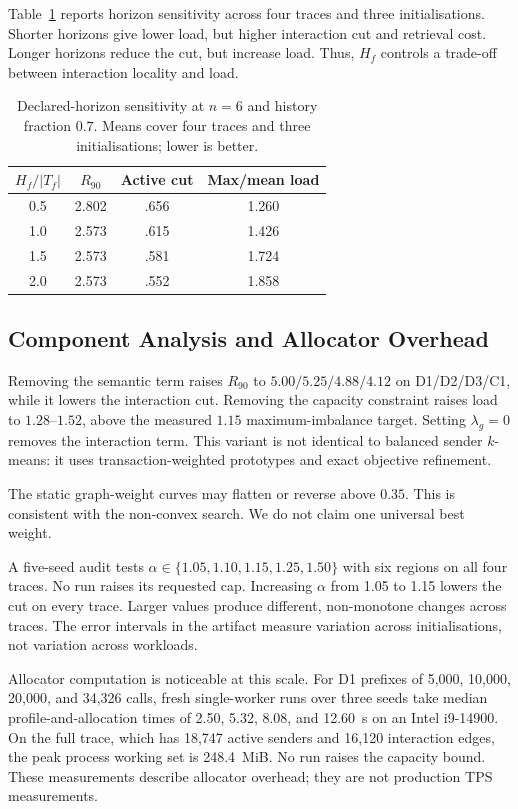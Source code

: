 \documentclass[conference,letterpaper]{IEEEtran}
\begin{document}
Table~\ref{tab:horizon} reports horizon sensitivity across four traces and
three initialisations. Shorter horizons give lower load, but higher interaction
cut and retrieval cost. Longer horizons reduce the cut, but increase load.
Thus, $H_f$ controls a trade-off between interaction locality and load.

\begin{table}[t]
\caption{Declared-horizon sensitivity at $n=6$ and history fraction $0.7$.
Means cover four traces and three initialisations; lower is better.}
\label{tab:horizon}
\centering
\small
\setlength{\tabcolsep}{5pt}
\begin{tabular}{@{}cccc@{}}
\toprule
$H_f/|T_f|$ & $R_{90}$ & Active cut & Max/mean load\\
\midrule
0.5 & 2.802 & .656 & 1.260\\
1.0 & 2.573 & .615 & 1.426\\
1.5 & 2.573 & .581 & 1.724\\
2.0 & 2.573 & .552 & 1.858\\
\bottomrule
\end{tabular}
\end{table}

\subsection{Component Analysis and Allocator Overhead}
\label{sec:components}

Removing the semantic term raises $R_{90}$ to
$5.00/5.25/4.88/4.12$ on D1/D2/D3/C1, while it lowers the interaction cut.
Removing the capacity constraint raises load to $1.28$--$1.52$, above the
measured $1.15$ maximum-imbalance target. Setting $\lambda_g=0$ removes the
interaction term. This variant is not identical to balanced sender $k$-means:
it uses transaction-weighted prototypes and exact objective refinement.

The static graph-weight curves may flatten or reverse above $0.35$. This is
consistent with the non-convex search. We do not claim one universal best
weight.

A five-seed audit tests
$\alpha\in\{1.05,1.10,1.15,1.25,1.50\}$ with six regions on all four traces.
No run raises its requested cap. Increasing $\alpha$ from 1.05 to 1.15 lowers
the cut on every trace. Larger values produce different, non-monotone changes
across traces. The error intervals in the artifact measure variation across
initialisations, not variation across workloads.

Allocator computation is noticeable at this scale. For D1 prefixes of
5,000, 10,000, 20,000, and 34,326 calls, fresh single-worker runs over three
seeds take median profile-and-allocation times of 2.50, 5.32, 8.08, and
12.60~s on an Intel i9-14900. On the full trace, which has 18,747 active
senders and 16,120 interaction edges, the peak process working set is
248.4~MiB. No run raises the capacity bound. These measurements describe
allocator overhead; they are not production TPS measurements.
\end{document}
